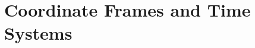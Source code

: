\documentclass[main.tex]{subfiles}
\begin{document}
\section{Coordinate Frames and Time Systems}\label{sec:frames}

\newcommand{\semia}{a}                               %
\newcommand{\wgsflat}{f}                              %
\newcommand{\eccsq}{e^{2}}                            %
\newcommand{\primevn}{N}                              %
\newcommand{\geolat}{\varphi}                         %
\newcommand{\geolon}{\lambda}                         %
\newcommand{\geoht}{h}                                %
\newcommand{\enuE}{\hat{\bm{e}}_{\mathrm{E}}}         %
\newcommand{\enuN}{\hat{\bm{e}}_{\mathrm{N}}}         %
\newcommand{\enuU}{\hat{\bm{e}}_{\mathrm{U}}}         %
\newcommand{\enuR}{\bm{R}_{\mathrm{ENU}}}             %
\newcommand{\eccentricityHEN}{\bm{e}_{\mathrm{HEN}}}  %
\newcommand{\elev}{\mathrm{el}}                       %
\newcommand{\azim}{\mathrm{az}}                       %
\newcommand{\leapgu}{\Delta_{\mathrm{GU}}}            %
\newcommand{\precP}{\bm{P}_{\mathrm{prec}}}           %
\newcommand{\nutN}{\bm{N}_{\mathrm{nut}}}             %
\newcommand{\polW}{\bm{W}_{\mathrm{pm}}}              %
\newcommand{\Umat}{\bm{U}}                            %
\newcommand{\rotR}[1]{\bm{R}_{#1}}                    %
\newcommand{\dpsi}{\Delta\psi}                        %
\newcommand{\deps}{\Delta\varepsilon}                %
\newcommand{\obleps}{\varepsilon}                     %
\newcommand{\gmst}{\mathrm{GMST}}
\newcommand{\gast}{\mathrm{GAST}}
\newcommand{\era}{\theta_{\mathrm{ERA}}}             %
\newcommand{\cipX}{X}                                 %
\newcommand{\cipY}{Y}                                 %
\newcommand{\cioloc}{s}                               %
\end{document}
